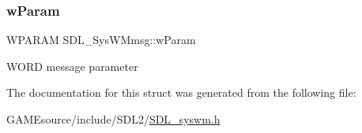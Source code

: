 \subsubsection{\texorpdfstring{w\+Param}{wParam}}
{\footnotesize\ttfamily W\+P\+A\+R\+AM S\+D\+L\+\_\+\+Sys\+W\+Mmsg\+::w\+Param}

W\+O\+RD message parameter 

The documentation for this struct was generated from the following file\+:\begin{DoxyCompactItemize}
\item 
G\+A\+M\+Esource/include/\+S\+D\+L2/\mbox{\hyperlink{_s_d_l__syswm_8h}{S\+D\+L\+\_\+syswm.\+h}}\end{DoxyCompactItemize}
